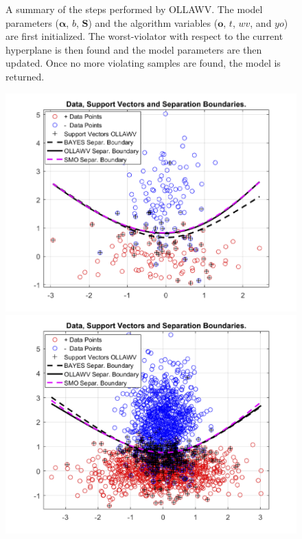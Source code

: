 \documentclass[reqno]{vcuthesis}
\numberwithin{equation}{chapter}
\begin{document}
\begin{figure}
\begin{minipage}{\textwidth}
{}
\caption{A summary of the steps performed by OLLAWV. The model parameters ($\bm \alpha$, $b$, $\bm S$) and the algorithm variables ($\bm o$, $t$, $wv$, and $yo$) are first initialized. The worst-violator with respect to the current hyperplane is then found and the model parameters are then updated. Once no more violating samples are found, the model is returned.}
\label{fig:ollawv}
\end{minipage}
\end{figure}

\begin{figure}[t!]
\centering
\begin{minipage}{0.49\textwidth}
\includegraphics[width=\textwidth]{figures/OLLAWVSeparation.png}
\end{minipage}
\begin{minipage}{0.49\textwidth}
\includegraphics[width=\textwidth]{figures/SeparationOLLAWV2000.png}

\end{minipage}
\end{figure}
\end{document}
